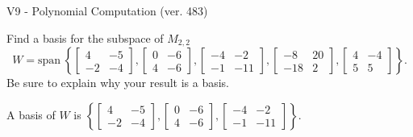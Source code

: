 \begin{exercise}
  \begin{exerciseTitle}V9 - Polynomial Computation (ver. 483)\end{exerciseTitle}
  \begin{exerciseStatement}
    Find a basis for the subspace of \(M_{2,2}\) 
\[W=\mathrm{span}\ \left\{\left[\begin{array}{cc}
4 & -5 \\
-2 & -4
\end{array}\right] , \left[\begin{array}{cc}
0 & -6 \\
4 & -6
\end{array}\right] , \left[\begin{array}{cc}
-4 & -2 \\
-1 & -11
\end{array}\right] , \left[\begin{array}{cc}
-8 & 20 \\
-18 & 2
\end{array}\right] , \left[\begin{array}{cc}
4 & -4 \\
5 & 5
\end{array}\right]\right\}.\]
 Be sure to explain why your result is a basis.


  \end{exerciseStatement}
  \begin{exerciseAnswer}
   A basis of \(W\) is  \(\left\{\left[\begin{array}{cc}
4 & -5 \\
-2 & -4
\end{array}\right] , \left[\begin{array}{cc}
0 & -6 \\
4 & -6
\end{array}\right] , \left[\begin{array}{cc}
-4 & -2 \\
-1 & -11
\end{array}\right]\right\}\).
  


  \end{exerciseAnswer}
\end{exercise}